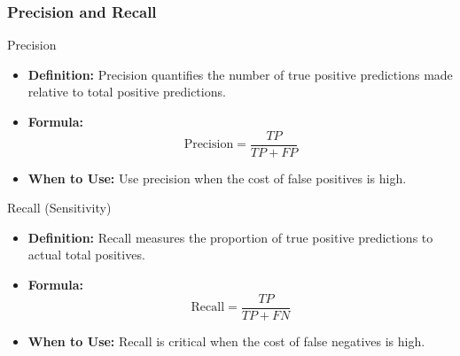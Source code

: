 \documentclass[aspectratio=169]{beamer}
\begin{document}
\begin{frame}[fragile]
    \frametitle{Precision and Recall}
    \begin{block}{Precision}
        \begin{itemize}
            \item \textbf{Definition:} Precision quantifies the number of true positive predictions made relative to total positive predictions.
            \item \textbf{Formula:}
            \begin{equation}
                \text{Precision} = \frac{TP}{TP + FP}
            \end{equation}
            \item \textbf{When to Use:} Use precision when the cost of false positives is high.
        \end{itemize}
    \end{block}

    \begin{block}{Recall (Sensitivity)}
        \begin{itemize}
            \item \textbf{Definition:} Recall measures the proportion of true positive predictions to actual total positives.
            \item \textbf{Formula:}
            \begin{equation}
                \text{Recall} = \frac{TP}{TP + FN}
            \end{equation}
            \item \textbf{When to Use:} Recall is critical when the cost of false negatives is high.
        \end{itemize}
    \end{block}
\end{frame}
\end{document}
